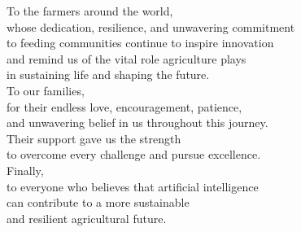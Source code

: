 
\thispagestyle{plain}

\vfill

\begin{center}
\begin{minipage}{0.78\textwidth}
\centering
{\Large\itshape

To the farmers around the world,\\[0.45cm]

whose dedication, resilience, and unwavering commitment\\
to feeding communities continue to inspire innovation\\
and remind us of the vital role agriculture plays\\
in sustaining life and shaping the future.\\[1.2cm]

To our families,\\[0.45cm]

for their endless love, encouragement, patience,\\
and unwavering belief in us throughout this journey.\\
Their support gave us the strength\\
to overcome every challenge and pursue excellence.\\[1.2cm]

Finally,\\[0.45cm]

to everyone who believes that artificial intelligence\\
can contribute to a more sustainable\\
and resilient agricultural future.

}
\end{minipage}
\end{center}

\vfill